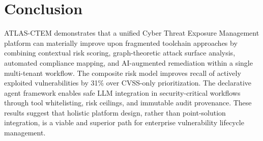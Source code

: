 \documentclass[conference]{IEEEtran}
\begin{document}
\section{Conclusion}

ATLAS-CTEM demonstrates that a unified Cyber Threat Exposure Management platform can materially improve upon fragmented toolchain approaches by combining contextual risk scoring, graph-theoretic attack surface analysis, automated compliance mapping, and AI-augmented remediation within a single multi-tenant workflow. The composite risk model improves recall of actively exploited vulnerabilities by 31\% over CVSS-only prioritization. The declarative agent framework enables safe LLM integration in security-critical workflows through tool whitelisting, risk ceilings, and immutable audit provenance. These results suggest that holistic platform design, rather than point-solution integration, is a viable and superior path for enterprise vulnerability lifecycle management.
\end{document}
